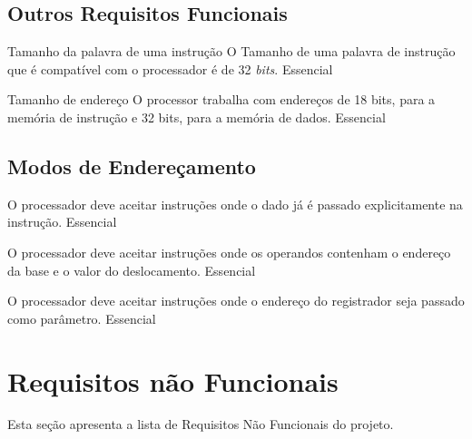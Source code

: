 \documentclass{article}
\begin{document}
	\subsection{Outros Requisitos Funcionais}

    \begin{functional}     
     
     \requirement
      {Tamanho da palavra de uma instrução}
      {O Tamanho de uma palavra de instrução que é compatível com o processador é de 32 \textit{bits}.}
      {Essencial}
      
	\end{functional}
	
	 \begin{functional}     
     
     \requirement
      {Tamanho de endereço}
      {O processor trabalha com endereços de 18 bits, para a memória de instrução e 32 bits, para a memória de dados. }
      {Essencial}
      
	\end{functional}

	\subsection{Modos de Endereçamento}

	\begin{functional}

      {O processador deve aceitar instruções onde o dado já é passado explicitamente na instrução.}
      {Essencial}

      {O processador deve aceitar instruções onde os operandos contenham o endereço da base e o valor do deslocamento.}
      {Essencial}

      {O processador deve aceitar instruções onde o endereço do registrador seja passado como parâmetro.}
      {Essencial}

     \end{functional}


\section{Requisitos não Funcionais}
Esta seção apresenta a lista de Requisitos Não Funcionais do projeto.
\end{document}
